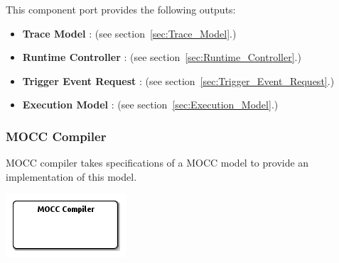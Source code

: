 \documentclass{gemoc} %
\begin{document}
This component port provides the following outputs:
\begin{itemize}
  \item \textbf{Trace Model} :
(see section~\ref{sec:Trace_Model}.)
  \item \textbf{Runtime Controller} :
(see section~\ref{sec:Runtime_Controller}.)
  \item \textbf{Trigger Event Request} :
(see section~\ref{sec:Trigger_Event_Request}.)
  \item \textbf{Execution Model} :
(see section~\ref{sec:Execution_Model}.)
\end{itemize}


\subsubsection{MOCC Compiler}
\label{sec:MOCC_Compiler}
MOCC compiler takes specifications of a MOCC model to provide an implementation of this model.
\begin{center}
\includegraphics*[trim=0.0cm 0.0cm 0cm 0.0cm, clip=true]{../images/generated/Generated_MOCC_Compiler.png}
\end{center}
\end{document}
